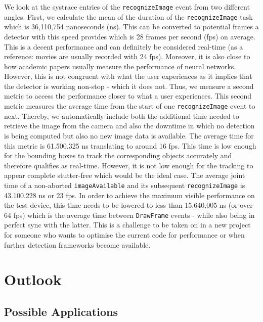 \documentclass[
			   fontsize=11pt,
               paper=a4,
               bibliography=totoc,
               idxtotoc,
               headsepline,
               footsepline,
               footinclude=false,
               BCOR=12mm,
               DIV=13,
               openany,   %
               ]
               {scrbook}
\newcommand{\code}[1]{\lstinline[basicstyle = \ttfamily\small]{#1}} %
\begin{document}
We look at the systrace entries of the \code{recognizeImage} event from two different angles. First, we calculate the mean of the duration of the \code{recognizeImage} task which is 36,110,754 nanoseconds (ns). This can be converted to potential frames a detector with this speed provides which is 28 frames per second (fps) on average. This is a decent performance and can definitely be considered real-time (as a reference: movies are usually recorded with 24 fps). Moreover, it is also close to how academic papers usually measure the performance of neural networks. However, this is not congruent with what the user experiences as it implies that the detector is working non-stop - which it does not. Thus, we measure a second metric to access the performance closer to what a user experiences. This second metric measures the average time from the start of one \code{recognizeImage} event to next. Thereby, we automatically include both the additional time needed to retrieve the image from the camera and also the downtime in which no detection is being computed but also no new image data is available. The average time for this metric is 61.500.325 ns translating to around 16 fps. This time is low enough for the bounding boxes to track the corresponding objects accurately and therefore qualifies as real-time. However, it is not low enough for the tracking to appear complete stutter-free which would be the ideal case. The average joint time of a non-aborted \code{imageAvailable} and its subsequent \code{recognizeImage} is 43.100.228 ns or 23 fps. In order to achieve the maximum visible performance on the test device, this time needs to be lowered to less than 15.640.005 ns (or over 64 fps) which is the average time between \code{DrawFrame} events - while also being in perfect sync with the latter. This is a challenge to be taken on in a new project for someone who wants to optimise the current code for performance or when further detection frameworks become available.


\chapter{Outlook}

\section{Possible Applications}
\end{document}
